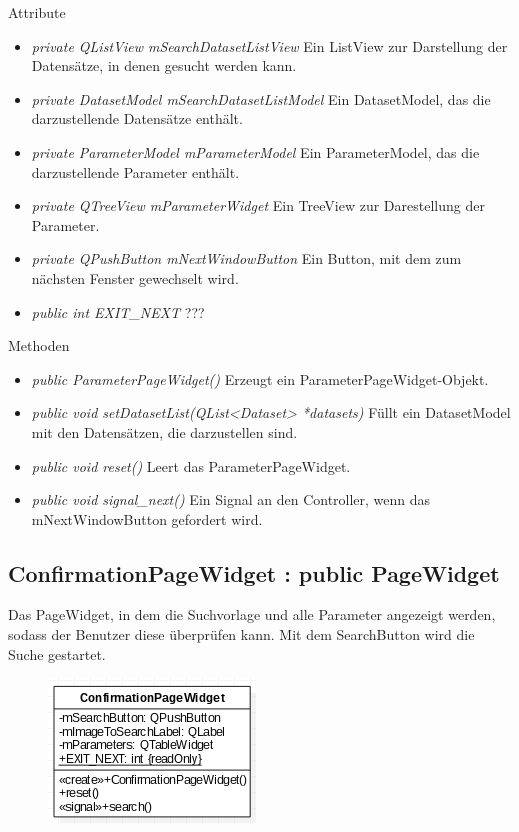 Attribute
\begin{itemize}
	\item\textit{private QListView mSearchDatasetListView}
	Ein ListView zur Darstellung der Datensätze, in denen gesucht werden kann.
	\item\textit{private DatasetModel mSearchDatasetListModel}
	Ein DatasetModel, das die darzustellende Datensätze enthält.
	\item\textit{private ParameterModel mParameterModel}
	Ein ParameterModel, das die darzustellende Parameter enthält.
	\item\textit{private QTreeView mParameterWidget}
	Ein TreeView zur Darestellung der Parameter.
	\item\textit{private QPushButton mNextWindowButton}
	Ein Button, mit dem zum nächsten Fenster gewechselt wird.
	\item\textit{public int EXIT\_NEXT} 
	???    
\end{itemize}

Methoden
\begin{itemize}
	\item\textit{public ParameterPageWidget()}
	Erzeugt ein ParameterPageWidget-Objekt.
	\item\textit{public void setDatasetList(QList<Dataset> *datasets)}
	Füllt ein DatasetModel mit den Datensätzen, die darzustellen sind.
	\item\textit{public void reset()}
	Leert das ParameterPageWidget.
	\item\textit{public void signal\_next()}
	Ein Signal an den Controller, wenn das mNextWindowButton gefordert wird. 
\end{itemize}

\subsection*{ConfirmationPageWidget : public PageWidget}
Das PageWidget, in dem die Suchvorlage und alle Parameter angezeigt werden, sodass der Benutzer diese überprüfen kann. Mit dem SearchButton wird die Suche gestartet.

\begin{figure}[H]
	\centering
	\includegraphics[scale=0.5]{img/Klassendiagramm/Klassen/View/ConfirmationPageWidget}
	\label{fig:confirmationPageWidget}
\end{figure}

